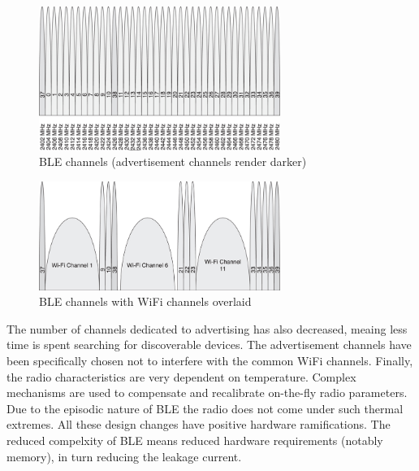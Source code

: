 \documentclass[]{article}
\begin{document}
\begin{figure}[htb]
	\begin{center}
		\includegraphics[width = 0.7\textwidth]{blechannels}
	\end{center}
	\caption{\ac{BLE} channels (advertisement channels render darker)}
	\label{fig:blechannels}
\end{figure}

\begin{figure}[htb]
	\begin{center}
		\includegraphics[width = 0.7\textwidth]{blechannelswifi}
	\end{center}
	\caption{\ac{BLE} channels with WiFi channels overlaid}
	\label{fig:blechannelswifi}
\end{figure}


The number of channels dedicated to advertising has also decreased, meaing less time is spent searching for discoverable devices. The advertisement channels have been specifically chosen not to interfere with the common WiFi channels. Finally, the radio characteristics are very dependent on temperature. Complex mechanisms are used to compensate and recalibrate on-the-fly radio parameters. Due to the episodic nature of \ac{BLE} the radio does not come under such thermal extremes. All these design changes have positive hardware ramifications. The reduced compelxity of \ac{BLE} means reduced hardware requirements (notably memory), in turn reducing the leakage current. 
\end{document}
